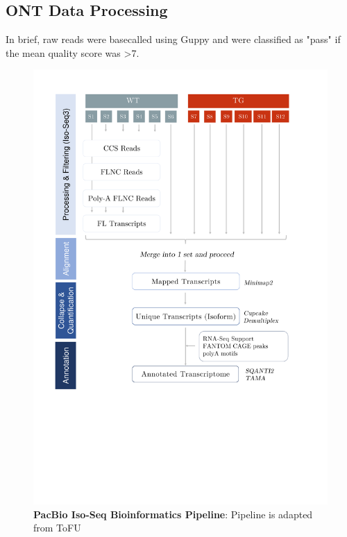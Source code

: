\subsection{ONT Data Processing}
In brief, raw reads were basecalled using Guppy and were classified as "pass" if the mean quality score was >7. 


\begin{figure}[htp]
	\centering
	\vspace{20pt}
	\includegraphics[page=1,trim={0 12cm 2cm 1cm},clip, scale = 0.45]{Figures/Pipeline.pdf}
	\captionsetup{width=0.95\textwidth}
	\caption[PacBio Iso-Seq Bioinformatics Pipeline]%
	{\textbf{PacBio Iso-Seq Bioinformatics Pipeline}: Pipeline is adapted from ToFU  \cite{Gordon2015}}
	\label{fig:isoseq_whole_pipeline}
\end{figure}
 
